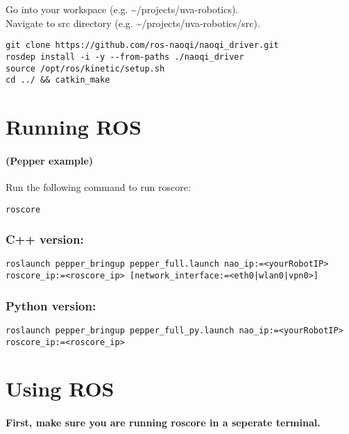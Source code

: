 Go into your workspace (e.g. \textasciitilde{}/projects/uva-robotics).\\
Navigate to src directory (e.g. \textasciitilde{}/projects/uva-robotics/src).

\begin{verbatim}
git clone https://github.com/ros-naoqi/naoqi_driver.git
rosdep install -i -y --from-paths ./naoqi_driver
source /opt/ros/kinetic/setup.sh
cd ../ && catkin_make
\end{verbatim}

\section{Running ROS}\label{running-ros}

\paragraph{(Pepper example)}Run the following command to run roscore:

\begin{verbatim}
roscore
\end{verbatim}

\subsubsection{C++ version:}\label{c-version}

\begin{verbatim}
roslaunch pepper_bringup pepper_full.launch nao_ip:=<yourRobotIP> roscore_ip:=<roscore_ip> [network_interface:=<eth0|wlan0|vpn0>]
\end{verbatim}

\subsubsection{Python version:}\label{python-version}

\begin{verbatim}
roslaunch pepper_bringup pepper_full_py.launch nao_ip:=<yourRobotIP> roscore_ip:=<roscore_ip>
\end{verbatim}

\section{Using ROS}\label{using-ros}

\paragraph{First, make sure you are running roscore in a seperate terminal.}

